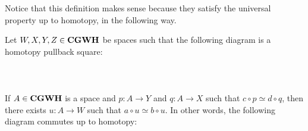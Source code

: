 \documentclass[a4paper]{article}
\begin{document}
Notice that this definition makes sense because they satisfy the universal property up to homotopy, in the following way. 

\begin{prp}{}{} Let $W,X,Y,Z\in\bold{CGWH}$ be spaces such that the following diagram is a homotopy pullback square: \\~\\
\\~\\
If $A\in\bold{CGWH}$ is a space and $p:A\to Y$ and $q:A\to X$ such that $c\circ p\simeq d\circ q$, then there exists $u:A\to W$ such that $a\circ u\simeq b\circ u$. In other words, the following diagram commutes up to homotopy: \\~\\
\\~\\
\end{prp}
\end{document}
